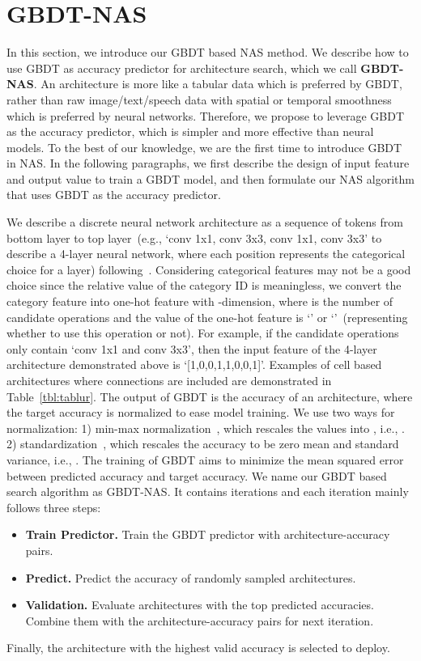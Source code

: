 \documentclass{article}
\begin{document}
\section{GBDT-NAS}
\label{sec:gbdtnas}
In this section, we introduce our GBDT based NAS method. We describe how to use GBDT as accuracy predictor for architecture search, which we call \textbf{GBDT-NAS}. An architecture is more like a tabular data which is preferred by GBDT, rather than raw image/text/speech data with spatial or temporal smoothness which is preferred by neural networks. Therefore, we propose to leverage GBDT as the accuracy predictor, which is simpler and more effective than neural models. To the best of our knowledge, we are the first time to introduce GBDT in NAS. In the following paragraphs, we first describe the design of input feature and output value to train a GBDT model, and then formulate our NAS algorithm that uses GBDT as the accuracy predictor.  

We describe a discrete neural network architecture as a sequence of tokens from bottom layer to top layer~(e.g., `conv 1x1, conv 3x3, conv 1x1, conv 3x3' to describe a 4-layer neural network, where each position represents the categorical choice for a layer) following~\cite{nas,nasnet,enas,amoebanet,nao}. Considering categorical features may not be a good choice since the relative value of the category ID is meaningless, we convert the category feature into one-hot feature with -dimension, where  is the number of candidate operations and the value of the one-hot feature is `' or `'~(representing whether to use this operation or not). For example, if the candidate operations only contain `conv 1x1 and conv 3x3', then the input feature of the 4-layer architecture demonstrated above is `[1,0,0,1,1,0,0,1]'. Examples of cell based architectures where connections are included are demonstrated in Table~\ref{tbl:tablur}. The output of GBDT is the accuracy of an architecture, where the target accuracy is normalized to ease model training. We use two ways for normalization: 1) min-max normalization~\cite{nao}, which rescales the values into , i.e.,  . 2) standardization~\cite{neuralpredictor}, which rescales the accuracy to be zero mean and standard variance, i.e., . The training of GBDT aims to minimize the mean squared error between predicted accuracy and target accuracy. 
We name our GBDT based search algorithm as GBDT-NAS. It contains  iterations and each iteration mainly follows three steps:
\begin{itemize}
    \item \textbf{Train Predictor.} Train the GBDT predictor with  architecture-accuracy pairs.
    \item \textbf{Predict.} Predict the accuracy of  randomly sampled architectures.
    \item \textbf{Validation.} Evaluate  architectures with the top  predicted accuracies. Combine them with the  architecture-accuracy pairs for next iteration.
\end{itemize}
Finally, the architecture with the highest valid accuracy is selected to deploy.
\end{document}
